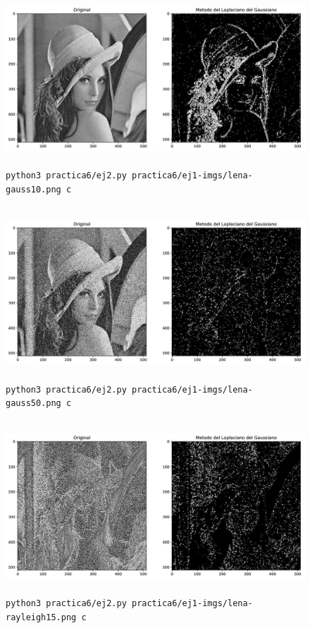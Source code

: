 \documentclass[11pt, spanish]{article}
\begin{document}
\begin{figure}[H]
\centering
    \includegraphics[height=6.5cm]{informe-imgs/ej2-c-lena-gauss10.jpg}
    \caption{\texttt{python3 practica6/ej2.py practica6/ej1-imgs/lena-gauss10.png c}}
\end{figure}

\begin{figure}[H]
\centering
    \includegraphics[height=6.5cm]{informe-imgs/ej2-c-lena-gauss50.jpg}
    \caption{\texttt{python3 practica6/ej2.py practica6/ej1-imgs/lena-gauss50.png c}}
\end{figure}

\begin{figure}[H]
\centering
    \includegraphics[height=6.5cm]{informe-imgs/ej2-c-lena-rayleigh15.jpg}
    \caption{\texttt{python3 practica6/ej2.py practica6/ej1-imgs/lena-rayleigh15.png c}}
\end{figure}
\end{document}

